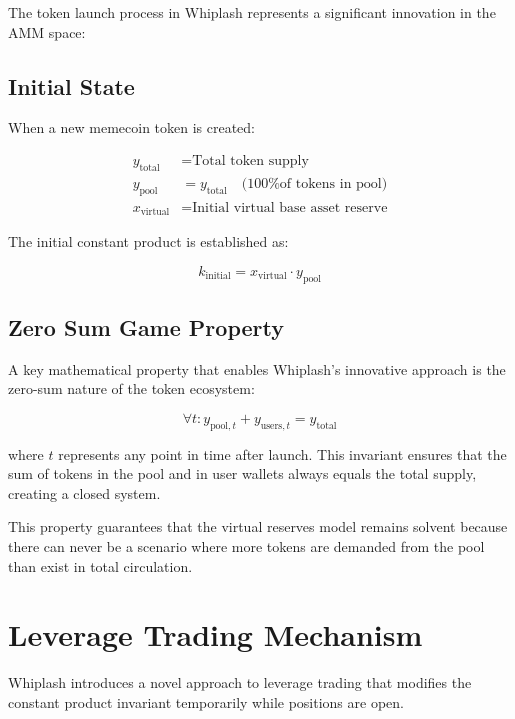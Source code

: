 \documentclass[11pt]{article}
\begin{document}
The token launch process in Whiplash represents a significant innovation in the AMM space:

\subsection{Initial State}
When a new memecoin token is created:

\begin{equation}
\begin{aligned}
y_{\text{total}} &= \text{Total token supply} \\
y_{\text{pool}} &= y_{\text{total}} \quad \text{(100\% of tokens in pool)} \\
x_{\text{virtual}} &= \text{Initial virtual base asset reserve}
\end{aligned}
\end{equation}

The initial constant product is established as:

\begin{equation}
k_{\text{initial}} = x_{\text{virtual}} \cdot y_{\text{pool}}
\end{equation}

\subsection{Zero Sum Game Property}

A key mathematical property that enables Whiplash's innovative approach is the zero-sum nature of the token ecosystem:

\begin{equation}
\forall t: y_{\text{pool},t} + y_{\text{users},t} = y_{\text{total}}
\end{equation}

where $t$ represents any point in time after launch. This invariant ensures that the sum of tokens in the pool and in user wallets always equals the total supply, creating a closed system.

This property guarantees that the virtual reserves model remains solvent because there can never be a scenario where more tokens are demanded from the pool than exist in total circulation.

\section{Leverage Trading Mechanism}

Whiplash introduces a novel approach to leverage trading that modifies the constant product invariant temporarily while positions are open.
\end{document}

